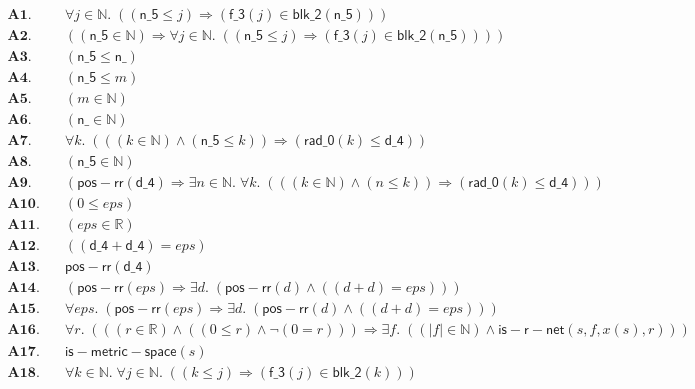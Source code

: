 \documentclass[11pt]{article}
\begin{document}
\begin{align*}
  \mathbf{A1.}\quad & \forall j \in \mathbb{N}.\; ((\mathsf{n\_5} \leq j) \Rightarrow (\mathsf{f\_3}(j) \in \mathsf{blk\_2}(\mathsf{n\_5}))) \\
  \mathbf{A2.}\quad & ((\mathsf{n\_5} \in \mathbb{N}) \Rightarrow \forall j \in \mathbb{N}.\; ((\mathsf{n\_5} \leq j) \Rightarrow (\mathsf{f\_3}(j) \in \mathsf{blk\_2}(\mathsf{n\_5})))) \\
  \mathbf{A3.}\quad & (\mathsf{n\_5} \leq \mathsf{n\_}) \\
  \mathbf{A4.}\quad & (\mathsf{n\_5} \leq m) \\
  \mathbf{A5.}\quad & (m \in \mathbb{N}) \\
  \mathbf{A6.}\quad & (\mathsf{n\_} \in \mathbb{N}) \\
  \mathbf{A7.}\quad & \forall k.\; (((k \in \mathbb{N}) \wedge (\mathsf{n\_5} \leq k)) \Rightarrow (\mathsf{rad\_0}(k) \leq \mathsf{d\_4})) \\
  \mathbf{A8.}\quad & (\mathsf{n\_5} \in \mathbb{N}) \\
  \mathbf{A9.}\quad & (\mathsf{pos{-}rr}(\mathsf{d\_4}) \Rightarrow \exists n \in \mathbb{N}.\; \forall k.\; (((k \in \mathbb{N}) \wedge (n \leq k)) \Rightarrow (\mathsf{rad\_0}(k) \leq \mathsf{d\_4}))) \\
  \mathbf{A10.}\quad & (0 \leq \mathit{eps}) \\
  \mathbf{A11.}\quad & (\mathit{eps} \in \mathbb{R}) \\
  \mathbf{A12.}\quad & ((\mathsf{d\_4} + \mathsf{d\_4}) = \mathit{eps}) \\
  \mathbf{A13.}\quad & \mathsf{pos{-}rr}(\mathsf{d\_4}) \\
  \mathbf{A14.}\quad & (\mathsf{pos{-}rr}(\mathit{eps}) \Rightarrow \exists d.\; (\mathsf{pos{-}rr}(d) \wedge ((d + d) = \mathit{eps}))) \\
  \mathbf{A15.}\quad & \forall \mathit{eps}.\; (\mathsf{pos{-}rr}(\mathit{eps}) \Rightarrow \exists d.\; (\mathsf{pos{-}rr}(d) \wedge ((d + d) = \mathit{eps}))) \\
  \mathbf{A16.}\quad & \forall r.\; (((r \in \mathbb{R}) \wedge ((0 \leq r) \wedge \neg (0 = r))) \Rightarrow \exists f.\; ((|f| \in \mathbb{N}) \wedge \mathsf{is{-}r{-}net}(s, f, x(s), r))) \\
  \mathbf{A17.}\quad & \mathsf{is{-}metric{-}space}(s) \\
  \mathbf{A18.}\quad & \forall k \in \mathbb{N}.\; \forall j \in \mathbb{N}.\; ((k \leq j) \Rightarrow (\mathsf{f\_3}(j) \in \mathsf{blk\_2}(k))) \\

\end{align*}
\end{document}
